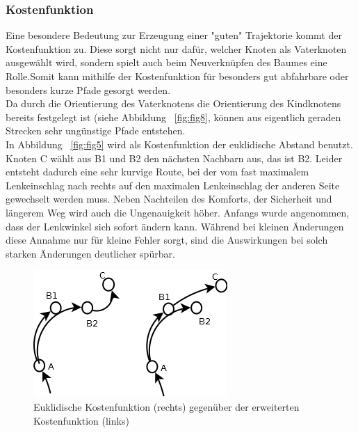 \subsubsection{Kostenfunktion}
\label{sec:Kosten}
Eine besondere Bedeutung zur Erzeugung einer "guten" Trajektorie kommt der Kostenfunktion zu. Diese sorgt nicht nur dafür, welcher Knoten als Vaterknoten ausgewählt wird, sondern spielt auch beim Neuverknüpfen des Baumes eine Rolle.Somit kann mithilfe der Kostenfunktion für besonders gut abfahrbare oder besonders kurze Pfade gesorgt werden. \\
Da durch die Orientierung des Vaterknotens die Orientierung des Kindknotens bereits festgelegt ist (siehe Abbildung ~\ref{fig:fig8}, können aus eigentlich geraden Strecken sehr ungünstige Pfade entstehen.\\
 In Abbildung ~\ref{fig:fig5} wird als Kostenfunktion der euklidische Abstand benutzt. Knoten C wählt aus B1 und B2 den nächsten Nachbarn aus, das ist B2. Leider entsteht dadurch eine sehr kurvige Route, bei der vom fast maximalem Lenkeinschlag nach rechts auf den maximalen Lenkeinschlag der anderen Seite gewechselt werden muss. Neben Nachteilen des Komforts, der Sicherheit und längerem Weg wird auch die Ungenauigkeit höher. Anfangs wurde angenommen, dass der Lenkwinkel sich sofort ändern kann. Während bei kleinen Änderungen diese Annahme nur für kleine Fehler sorgt, sind die Auswirkungen bei solch starken Änderungen deutlicher spürbar.


\begin{figure}[htb]
  \label{fig:fig6}  
    \centering
\includegraphics[scale=1]{Bilder/Gute_schlechte_funktion.png} 
\caption{Euklidische Kostenfunktion (rechts) gegenüber der erweiterten Kostenfunktion (links)}
\end{figure}



